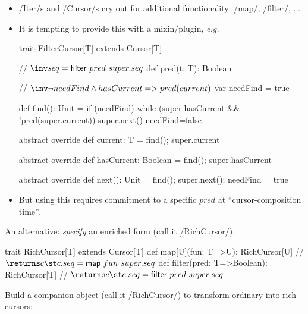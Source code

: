 \documentclass{ip3}
\begin{document}
\begin{foil}
\begin{itemize}
 \item \sc/Iter/s and \sc/Cursor/s cry out for additional functionality: \sc/map/, \sc/filter/, ...
 \item It is tempting to provide this with a mixin/plugin, \textit{e.g.}
\begin{-code}

   trait FilterCursor[T] extends Cursor[T] {
     // $\inv seq = \mathsf{filter}~pred~super.seq$
     def pred(t: T): Boolean
     
     // $\inv \lnot needFind \land hasCurrent => pred(current) $
     var needFind = true
     
     def find(): Unit = if (needFind) {
         while (super.hasCurrent && !pred(super.current)) super.next()
         needFind=false
     }
     
     abstract override def current: T          = { find(); super.current }
     
     abstract override def hasCurrent: Boolean = { find(); super.hasCurrent }
     
     abstract override def next(): Unit        = 
                       { find(); super.next(); needFind = true }
     
   } 
\end{-code}
\item But using this requires commitment to a specific $pred$ at ``cursor-composition time''.
\end{itemize} 
\end{foil}

\begin{foil}
\begin{itemize}
 \vitem An alternative: \textit{specify} an enriched form (call it \sc/RichCursor/).  
\begin{code}

   trait RichCursor[T] extends Cursor[T] { 
     def map[U](fun: T=>U):        RichCursor[U] // $\returns c \st c.seq = \mathsf{map}~fun~super.seq$
     def filter(pred: T=>Boolean): RichCursor[T] // $\returns c \st c.seq = \mathsf{filter}~pred~super.seq$
   }   
\end{code}

\vitem Build a companion object (call it \sc/RichCursor/) to transform ordinary into rich cursors:

\end{itemize} 
\end{foil}
\end{document}
